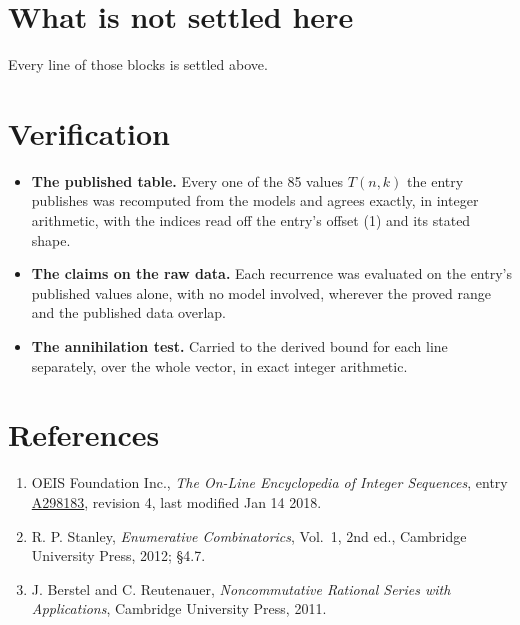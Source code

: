 \documentclass[11pt]{article}
\theoremstyle{definition}
\begin{document}
\section{What is not settled here}

Every line of those blocks is settled above.

\section{Verification}

\begin{itemize}

\item {\bfseries The published table.} Every one of the 85 values $T(n,k)$ the entry publishes was recomputed from the models and agrees exactly, in integer arithmetic, with the indices read off the entry's offset (1) and its stated shape.

\item {\bfseries The claims on the raw data.} Each recurrence was evaluated on the entry's published values alone, with no model involved, wherever the proved range and the published data overlap.

\item {\bfseries The annihilation test.} Carried to the derived bound for each line separately, over the whole vector, in exact integer arithmetic.

\end{itemize}

\section{References}

\begin{enumerate}

\item OEIS Foundation Inc., \emph{The On-Line Encyclopedia of Integer Sequences}, entry \href{https://oeis.org/A298183}{A298183}, revision 4, last modified Jan 14 2018.

\item R. P. Stanley, \emph{Enumerative Combinatorics}, Vol.~1, 2nd ed., Cambridge University Press, 2012; \S4.7.

\item J. Berstel and C. Reutenauer, \emph{Noncommutative Rational Series with Applications}, Cambridge University Press, 2011.

\end{enumerate}
\end{document}
